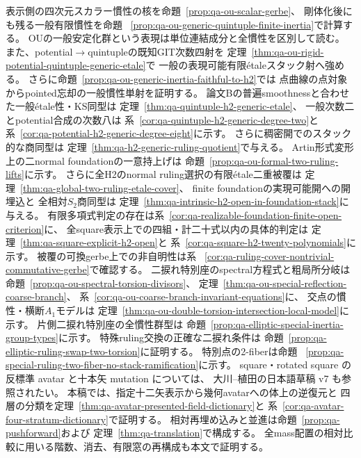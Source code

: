 \documentclass[a4paper,11pt]{ltjsarticle}
\numberwithin{equation}{section}
\theoremstyle{plain}
\theoremstyle{definition}
\theoremstyle{remark}
\begin{document}
表示側の四次元スカラー慣性の核を命題~\ref{prop:qa-ou-scalar-gerbe}、
剛体化後にも残る一般有限慣性を命題
~\ref{prop:qa-ou-generic-quintuple-finite-inertia}で計算する。
OUの一般安定化群という表現は単位連結成分と全慣性を区別して読む。
また、potential$\to$quintupleの既知GIT次数四射を
定理~\ref{thm:qa-ou-rigid-potential-quintuple-generic-etale}で
一般の表現可能有限étaleスタック射へ強める。
さらに命題~\ref{prop:qa-ou-generic-inertia-faithful-to-h2}では
点曲線の点対象からpointed忘却の一般慣性単射を証明する。
論文Bの普遍smoothnessと合わせた一般étale性・KS同型は
定理~\ref{thm:qa-quintuple-h2-generic-etale}、
一般次数二とpotential合成の次数八は
系~\ref{cor:qa-quintuple-h2-generic-degree-two}と
系~\ref{cor:qa-potential-h2-generic-degree-eight}に示す。
さらに稠密開でのスタック的な商同型は
定理~\ref{thm:qa-h2-generic-ruling-quotient}で与える。
Artin形式変形上の二normal foundationの一意持上げは
命題~\ref{prop:qa-ou-formal-two-ruling-lifts}に示す。
さらに全H2のnormal ruling選択の有限étale二重被覆は
定理~\ref{thm:qa-global-two-ruling-etale-cover}、
finite foundationの実現可能開への開埋込と
全相対$S_2$商同型は
定理~\ref{thm:qa-intrinsic-h2-open-in-foundation-stack}に与える。
有限多項式判定の存在は系~\ref{cor:qa-realizable-foundation-finite-open-criterion}に、
全square表示上での四組・計二十式以内の具体的判定は
定理~\ref{thm:qa-square-explicit-h2-open}と
系~\ref{cor:qa-square-h2-twenty-polynomials}に示す。
被覆の可換gerbe上での非自明性は系
~\ref{cor:qa-ruling-cover-nontrivial-commutative-gerbe}で確認する。
二捩れ特別座のspectral方程式と粗局所分岐は
命題~\ref{prop:qa-ou-spectral-torsion-divisors}、
定理~\ref{thm:qa-ou-special-reflection-coarse-branch}、
系~\ref{cor:qa-ou-coarse-branch-invariant-equations}に、
交点の慣性・横断$A_1$モデルは
定理~\ref{thm:qa-ou-double-torsion-intersection-local-model}に示す。
片側二捩れ特別座の全慣性群型は
命題~\ref{prop:qa-elliptic-special-inertia-group-types}に示す。
特殊ruling交換の正確な二捩れ条件は
命題~\ref{prop:qa-elliptic-ruling-swap-two-torsion}に証明する。
特別点の2-fiberは命題
~\ref{prop:qa-special-ruling-two-fiber-no-stack-ramification}に示す。
square・rotated square の反標準 avatar と十本矢 mutation については、
大川--植田の日本語草稿 v7 \cite{AvatarVSeven2026}も参照されたい。
本稿では、指定十二矢表示から幾何avatarへの体上の逆復元と
四層の分類を定理~\ref{thm:qa-avatar-presented-field-dictionary}と
系~\ref{cor:qa-avatar-four-stratum-dictionary}で証明する。
相対再埋め込みと並進は命題~\ref{prop:qa-pushforward}および
定理~\ref{thm:qa-translation}で構成する。
全mass配置の相対比較に用いる階数、消去、有限窓の再構成も本文で証明する。
\end{document}
